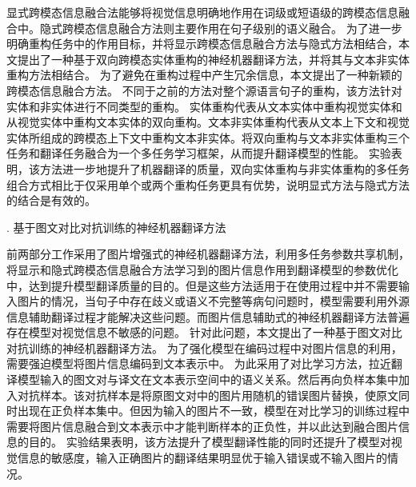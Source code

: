 显式跨模态信息融合法能够将视觉信息明确地作用在词级或短语级的跨模态信息融合中。隐式跨模态信息融合方法则主要作用在句子级别的语义融合。
为了进一步明确重构任务中的作用目标，并将显示跨模态信息融合方法与隐式方法相结合，本文提出了一种基于双向跨模态实体重构的神经机器翻译方法，并将其与文本非实体重构方法相结合。
为了避免在重构过程中产生冗余信息，本文提出了一种新颖的跨模态信息融合方法。
不同于之前的方法对整个源语言句子的重构，该方法针对实体和非实体进行不同类型的重构。
实体重构代表从文本实体中重构视觉实体和从视觉实体中重构文本实体的双向重构。文本非实体重构代表从文本上下文和视觉实体所组成的跨模态上下文中重构文本非实体。将双向重构与文本非实体重构三个任务和翻译任务融合为一个多任务学习框架，从而提升翻译模型的性能。
实验表明，该方法进一步地提升了机器翻译的质量，双向实体重构与非实体重构的多任务组合方式相比于仅采用单个或两个重构任务更具有优势，说明显式方法与隐式方法的结合是有效的。

{. 基于图文对比对抗训练的神经机器翻译方法}

前两部分工作采用了图片增强式的神经机器翻译方法，利用多任务参数共享机制，将显示和隐式跨模态信息融合方法学习到的图片信息作用到翻译模型的参数优化中，达到提升模型翻译质量的目的。但是这些方法适用于在使用过程中并不需要输入图片的情况，当句子中存在歧义或语义不完整等病句问题时，模型需要利用外源信息辅助翻译过程才能解决这些问题。而图片信息辅助式的神经机器翻译方法普遍存在模型对视觉信息不敏感的问题。
针对此问题，本文提出了一种基于图文对比对抗训练的神经机器翻译方法。
为了强化模型在编码过程中对图片信息的利用，需要强迫模型将图片信息编码到文本表示中。
为此采用了对比学习方法，拉近翻译模型输入的图文对与译文在文本表示空间中的语义关系。然后再向负样本集中加入对抗样本。该对抗样本是将原图文对中的图片用随机的错误图片替换，使原文同时出现在正负样本集中。但因为输入的图片不一致，模型在对比学习的训练过程中需要将图片信息融合到文本表示中才能判断样本的正负性，并以此达到融合图片信息的目的。
实验结果表明，该方法提升了模型翻译性能的同时还提升了模型对视觉信息的敏感度，输入正确图片的翻译结果明显优于输入错误或不输入图片的情况。


